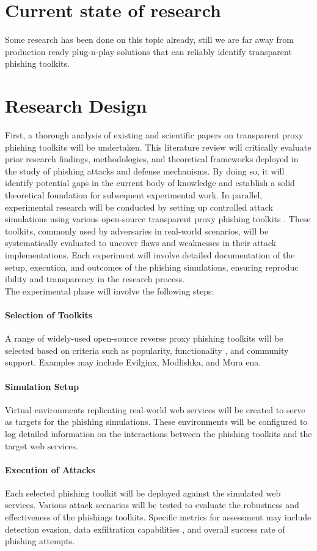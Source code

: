 \documentclass[12pt]{scrbook}
\begin{document}
\newpage \section{Current state of research}
Some research has been done on this topic already, still we are far away from production ready plug-n-play solutions that can
reliably identify transparent phishing toolkits.

\section{Research Design} 
First, a thorough analysis of existing and scientific papers on transparent proxy
 phishing toolkits will be undertaken. This literature review will critically
 evaluate prior research findings, methodologies, and theoretical frameworks
 deployed in the study of phishing attacks and defense mechanisms. By doing
 so, it will identify potential gaps in the current body of knowledge and establish
 a solid theoretical foundation for subsequent experimental work.
In parallel, experimental research will be conducted by setting up controlled
 attack simulations using various open-source transparent proxy phishing toolkits
. These toolkits, commonly used by adversaries in real-world scenarios, will
 be systematically evaluated to uncover flaws and weaknesses in their attack
 implementations. Each experiment will involve detailed documentation of the
 setup, execution, and outcomes of the phishing simulations, ensuring reproduc
ibility and transparency in the research process.\\
The experimental phase will involve the following steps:

\paragraph{Selection of Toolkits}
A range of widely-used open-source reverse proxy
phishing toolkits will be selected based on criteria such as popularity, functionality
, and community support. Examples may include Evilginx, Modlishka, and Mura
ena.
\paragraph{Simulation Setup}
Virtual environments replicating real-world web services
will be created to serve as targets for the phishing simulations. These environments
will be configured to log detailed information on the interactions between
the phishing toolkits and the target web services.
\paragraph{Execution of Attacks}Each selected phishing toolkit will be deployed
against the simulated web services. Various attack scenarios will be tested
to evaluate the robustness and effectiveness of the phishings toolkits. Specific
metrics for assessment may include detection evasion, data exfiltration capabilities
, and overall success rate of phishing attempts.
\end{document}
